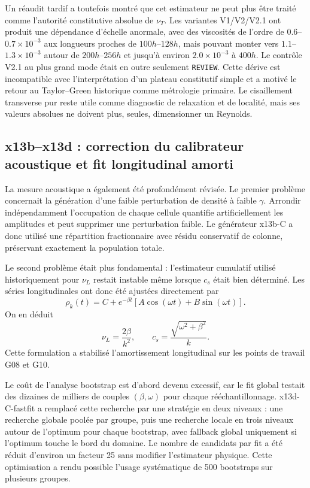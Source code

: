 \documentclass[11pt,a4paper]{article}
\begin{document}
Un réaudit tardif a toutefois montré que cet estimateur ne peut plus être traité comme l'autorité constitutive absolue de $\nu_T$. Les variantes V1/V2/V2.1 ont produit une dépendance d'échelle anormale, avec des viscosités de l'ordre de $0.6$--$0.7\times10^{-3}$ aux longueurs proches de $100h$--$128h$, mais pouvant monter vers $1.1$--$1.3\times10^{-3}$ autour de $200h$--$256h$ et jusqu'à environ $2.0\times10^{-3}$ à $400h$. Le contrôle V2.1 au plus grand mode était en outre seulement \texttt{REVIEW}. Cette dérive est incompatible avec l'interprétation d'un plateau constitutif simple et a motivé le retour au Taylor--Green historique comme métrologie primaire. Le cisaillement transverse pur reste utile comme diagnostic de relaxation et de localité, mais ses valeurs absolues ne doivent plus, seules, dimensionner un Reynolds.

\subsection{x13b--x13d : correction du calibrateur acoustique et fit longitudinal amorti}

La mesure acoustique a également été profondément révisée. Le premier problème concernait la génération d'une faible perturbation de densité à faible $\gamma$. Arrondir indépendamment l'occupation de chaque cellule quantifie artificiellement les amplitudes et peut supprimer une perturbation faible. Le générateur x13b-C a donc utilisé une répartition fractionnaire avec résidu conservatif de colonne, préservant exactement la population totale.

Le second problème était plus fondamental : l'estimateur cumulatif utilisé historiquement pour $\nu_L$ restait instable même lorsque $c_s$ était bien déterminé. Les séries longitudinales ont donc été ajustées directement par
\begin{equation}
  \rho_k(t)
  =
  C
  +
  e^{-\beta t}
  \left[
  A\cos(\omega t)+B\sin(\omega t)
  \right].
  \label{eq:x13-damped-mode}
\end{equation}
On en déduit
\begin{equation}
  \boxed{
  \nu_L=\frac{2\beta}{k^2},
  \qquad
  c_s=\frac{\sqrt{\omega^2+\beta^2}}{k}.
  }
  \label{eq:x13-cs-nuL}
\end{equation}
Cette formulation a stabilisé l'amortissement longitudinal sur les points de travail G08 et G10.

Le coût de l'analyse bootstrap est d'abord devenu excessif, car le fit global testait des dizaines de milliers de couples $(\beta,\omega)$ pour chaque rééchantillonnage. x13d-C-fastfit a remplacé cette recherche par une stratégie en deux niveaux : une recherche globale poolée par groupe, puis une recherche locale en trois niveaux autour de l'optimum pour chaque bootstrap, avec fallback global uniquement si l'optimum touche le bord du domaine. Le nombre de candidats par fit a été réduit d'environ un facteur 25 sans modifier l'estimateur physique. Cette optimisation a rendu possible l'usage systématique de 500 bootstraps sur plusieurs groupes.
\end{document}

